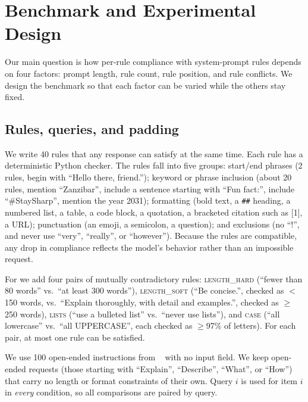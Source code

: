 \section{Benchmark and Experimental Design}
\label{sec:method}

Our main question is how per-rule compliance with system-prompt rules depends on four factors: prompt length, rule count, rule position, and rule conflicts.
We design the benchmark so that each factor can be varied while the others stay fixed.

\subsection{Rules, queries, and padding}

We write 40 rules that any response can satisfy at the same time.
Each rule has a deterministic Python checker.
The rules fall into five groups:
start/end phrases (2 rules, \eg begin with ``Hello there, friend.'');
keyword or phrase inclusion (about 20 rules, \eg mention ``Zanzibar'', include a sentence starting with ``Fun fact:'', include ``\#StaySharp'', mention the year 2031);
formatting (bold text, a \texttt{\#\#} heading, a numbered list, a table, a code block, a quotation, a bracketed citation such as [1], a URL);
punctuation (an emoji, a semicolon, a question);
and exclusions (no ``!'', and never use ``very'', ``really'', or ``however'').
Because the rules are compatible, any drop in compliance reflects the model's behavior rather than an impossible request.

For \expD we add four pairs of mutually contradictory rules:
\textsc{length\_hard} (``fewer than 80 words'' vs.\ ``at least 300 words''),
\textsc{length\_soft} (``Be concise.'', checked as $<$150 words, vs.\ ``Explain thoroughly, with detail and examples.'', checked as $\ge$250 words),
\textsc{lists} (``use a bulleted list'' vs.\ ``never use lists''),
and \textsc{case} (``all lowercase'' vs.\ ``all UPPERCASE'', each checked as $\ge$97\% of letters).
For each pair, at most one rule can be satisfied.

We use 100 open-ended instructions from \alpaca~\cite{taori2023alpaca} with no input field.
We keep open-ended requests (\eg those starting with ``Explain'', ``Describe'', ``What'', or ``How'') that carry no length or format constraints of their own.
Query $i$ is used for item $i$ in {\em every} condition, so all comparisons are paired by query.


